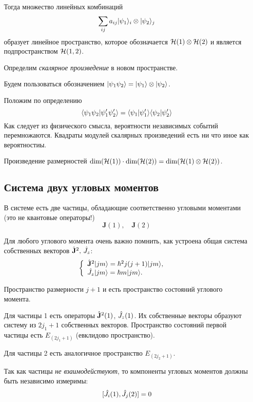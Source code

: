 Тогда множество линейных комбинаций
$$
    \sum_{ij} a_{ij} | \psi_1 \rangle_i \otimes | \psi_2 \rangle_j
$$
образует линейное пространство, которое обозначается $\mathcal H(1) \otimes \mathcal H(2)$ и является подпространством $\mathcal H(1,2)$.

\Rem Определим \emph{скалярное произведение} в новом пространстве.

Будем пользоваться обозначением $| \psi_1 \psi_2 \rangle = | \psi_1 \rangle \otimes | \psi_2 \rangle$.

Положим по определению
$$
    \langle \psi_1 \psi_2 | \psi'_1 \psi'_2 \rangle  = \langle \psi_1 | \psi'_1 \rangle \langle \psi_2 | \psi'_2 \rangle
$$
Как следует из физического смысла, вероятности независимых событий перемножаются. Квадраты модулей скалярных произведений есть ни что иное как вероятностиы.

Произведение размерностей $\textrm{dim} (\mathcal H(1)) \cdot \textrm{dim} (\mathcal H(2)) = \textrm{dim} (\mathcal H(1) \otimes \mathcal H(2))$.

\subsection{Система двух угловых моментов}

В системе есть две частицы, обладающие соответственно угловыми моментами (это не квантовые операторы!)
$$
    \mathbf J(1), \quad \mathbf J(2)
$$

\Reminder Для любого углового момента очень важно помнить, как устроена общая система собственных векторов $\Hat{ \mathbf{J}}^2, \, \Hat{J}_z$:
\def \jsq {\Hat{\mathbf J}^2}
\def \jz  {\Hat J_z}
\begin{equation}
\left\{
  \begin{array}{ll}
    \jsq \qu{jm} = \hbar^2 j(j+1) \qu{jm}, & \hbox{} \\
    \jz \qu{jm} = \hbar m \qu{jm}. & \hbox{}
  \end{array}
\right.
\label{eq::common_eigs}
\end{equation}

Пространство размерности $j+1$ и есть пространство состояний углового момента.

Для частицы 1 есть операторы $\jsq(1)$, $\jz(1)$. Их собственные векторы образуют систему из $2j_1 + 1$ собственных векторов. Пространство состояний первой частицы есть $E_{(2j_1 + 1)}$ (евклидово пространство).

Для частицы 2 есть аналогичное пространство $E_{(2j_2 + 1)}$.

Так как частицы \emph{не взаимодействуют}, то компоненты угловых моментов должны быть независимо измеримы:
$$
    [\Hat J_i (1), \Hat J_j(2)] = 0
$$


